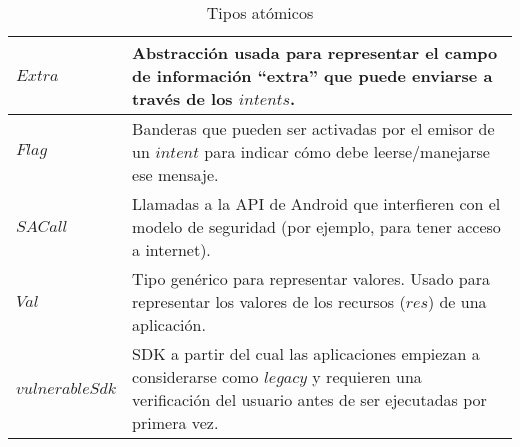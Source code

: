 \begin{table}[thb!]
\begin{tabularx}{\linewidth}{|l X|}
        \hline
        $Extra$                  & Abstracción usada para representar el campo de información ``extra'' que puede enviarse a través de los $intents$.    \\
        \hline
        $Flag$                   & Banderas que pueden ser activadas por el emisor de un $intent$ para indicar cómo debe leerse/manejarse ese mensaje.   \\
        \hline
        $SACall$                 & Llamadas a la API de Android que interfieren con el modelo de seguridad (por ejemplo, para tener acceso a internet).  \\
        \hline
        $Val$                    & Tipo genérico para representar valores. Usado para representar los valores de los recursos ($res$) de una aplicación. \\
        \hline
        $vulnerableSdk$          & SDK a partir del cual las aplicaciones empiezan a considerarse como
        $legacy$ y requieren una verificación del usuario antes de ser ejecutadas por primera vez.                                                       \\
        \hline
    \end{tabularx}
    \caption{Tipos atómicos}
    \label{table:atomic_types}
\end{table}
